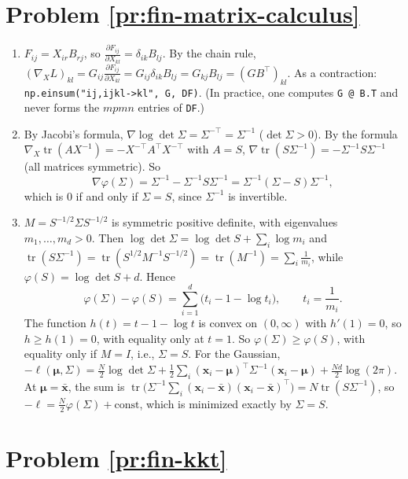 \documentclass[11pt]{article}
\DeclareMathOperator{\tr}{tr}
\begin{document}
\section*{Problem \ref{pr:fin-matrix-calculus}}

\begin{enumerate}[label=(\alph*)]
    \item $F_{ij} = X_{ir}B_{rj}$, so $\frac{\partial F_{ij}}{\partial X_{kl}} = \delta_{ik}B_{lj}$. By the chain rule, $(\nabla_X L)_{kl} = G_{ij}\frac{\partial F_{ij}}{\partial X_{kl}} = G_{ij}\delta_{ik}B_{lj} = G_{kj}B_{lj} = (GB^\top)_{kl}$. As a contraction: \texttt{np.einsum("ij,ijkl->kl", G, DF)}. (In practice, one computes \texttt{G @ B.T} and never forms the $mpmn$ entries of \texttt{DF}.)
    \item By Jacobi's formula, $\nabla\log\det\Sigma = \Sigma^{-\top} = \Sigma^{-1}$ ($\det\Sigma > 0$). By the formula $\nabla_X\tr(AX^{-1}) = -X^{-\top}A^\top X^{-\top}$ with $A = S$, $\nabla\tr(S\Sigma^{-1}) = -\Sigma^{-1}S\Sigma^{-1}$ (all matrices symmetric). So
    \[\nabla\varphi(\Sigma) = \Sigma^{-1} - \Sigma^{-1}S\Sigma^{-1} = \Sigma^{-1}(\Sigma - S)\Sigma^{-1},\]
    which is $0$ if and only if $\Sigma = S$, since $\Sigma^{-1}$ is invertible.
    \item $M = S^{-1/2}\Sigma S^{-1/2}$ is symmetric positive definite, with eigenvalues $m_1, \ldots, m_d > 0$. Then $\log\det\Sigma = \log\det S + \sum_i\log m_i$ and $\tr(S\Sigma^{-1}) = \tr(S^{1/2}M^{-1}S^{-1/2}) = \tr(M^{-1}) = \sum_i\frac{1}{m_i}$, while $\varphi(S) = \log\det S + d$. Hence
    \[\varphi(\Sigma) - \varphi(S) = \sum_{i=1}^d\big(t_i - 1 - \log t_i\big), \qquad t_i = \frac{1}{m_i}.\]
    The function $h(t) = t - 1 - \log t$ is convex on $(0, \infty)$ with $h'(1) = 0$, so $h \geq h(1) = 0$, with equality only at $t = 1$. So $\varphi(\Sigma) \geq \varphi(S)$, with equality only if $M = I$, i.e., $\Sigma = S$.
    For the Gaussian, $-\ell(\boldsymbol{\mu}, \Sigma) = \frac{N}{2}\log\det\Sigma + \frac{1}{2}\sum_i(\mathbf{x}_i - \boldsymbol{\mu})^\top\Sigma^{-1}(\mathbf{x}_i - \boldsymbol{\mu}) + \frac{Nd}{2}\log(2\pi)$. At $\boldsymbol{\mu} = \bar{\mathbf{x}}$, the sum is $\tr\big(\Sigma^{-1}\sum_i(\mathbf{x}_i - \bar{\mathbf{x}})(\mathbf{x}_i - \bar{\mathbf{x}})^\top\big) = N\tr(S\Sigma^{-1})$, so $-\ell = \frac{N}{2}\varphi(\Sigma) + \text{const}$, which is minimized exactly by $\Sigma = S$.
\end{enumerate}

\section*{Problem \ref{pr:fin-kkt}}
\end{document}
